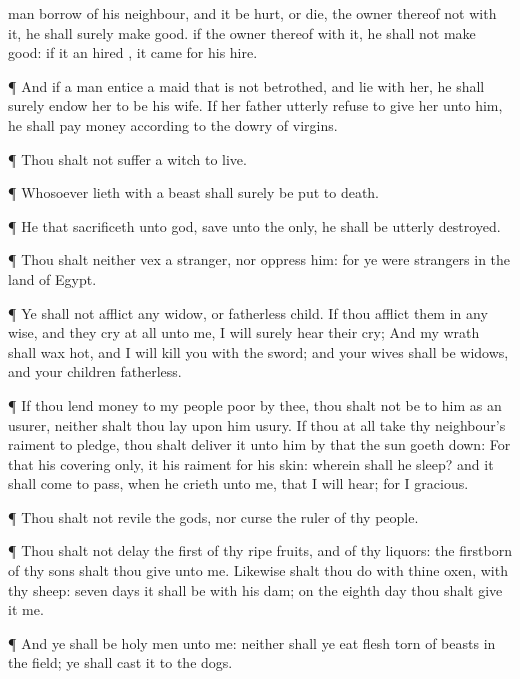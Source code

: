 {man
borrow
{} of his
neighbour, and it be
hurt, or
die, the
owner thereof
{} not with
it, he shall
surely make
{}
good.
 if the
owner thereof
{} with it, he shall not make
{}
good: if it
{} an
hired
{}, it
came for his
hire.
\par }{\PP {}¶ And if a
man
entice a
maid that is not
betrothed, and
lie with her, he shall
surely
endow her to be his
wife.
If her
father
utterly
refuse to
give her unto him, he shall
pay
money according to the
dowry of
virgins.
\par }{\PP {}¶ Thou shalt not suffer a
witch to
live.
\par }{\PP {}¶ Whosoever
lieth with a
beast shall
surely be put to
death.
\par }{\PP {}¶ He that
sacrificeth unto
{}
god,
save unto the
{} only, he shall be utterly
destroyed.
\par }{\PP {}¶ Thou shalt neither
vex a
stranger, nor
oppress him: for ye were
strangers in the
land of
Egypt.
\par }{\PP {}¶ Ye shall not
afflict any
widow, or fatherless
child.
If thou
afflict them in any
wise, and they
cry at
all unto me, I will
surely
hear their
cry;
And my
wrath shall wax
hot, and I will
kill you with the
sword; and your
wives shall be
widows, and your
children
fatherless.
\par }{\PP {}¶ If thou
lend
money to
{} my
people
{}
poor by thee, thou shalt not be to him as an
usurer, neither shalt thou
lay upon him
usury.
If thou at
all
take thy
neighbour’s
raiment to
pledge, thou shalt
deliver it unto him
by that the
sun goeth
down:
For that
{} his
covering only, it
{} his
raiment for his
skin: wherein shall he
sleep? and it shall come to pass, when he
crieth unto me, that I will
hear; for I
{}
gracious.
\par }{\PP {}¶ Thou shalt not
revile the
gods, nor
curse the
ruler of thy
people.
\par }{\PP {}¶ Thou shalt not
delay
{} the first of thy ripe
fruits, and of thy
liquors: the
firstborn of thy
sons shalt thou
give unto me.
Likewise shalt thou
do with thine
oxen,
{} with thy
sheep:
seven
days it shall be with his
dam; on the
eighth
day thou shalt
give it me.
\par }{\PP {}¶ And ye shall be
holy
men unto me: neither shall ye
eat
{}
flesh
{} torn of
beasts in the
field; ye shall
cast it to the
dogs.

}

